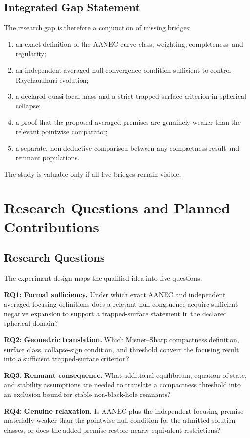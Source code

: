 \documentclass[conference]{IEEEtran}
\begin{document}
\subsection{Integrated Gap Statement}
The research gap is therefore a conjunction of missing bridges:
\begin{enumerate}
\item an exact definition of the AANEC curve class, weighting, completeness, and regularity;
\item an independent averaged null-convergence condition sufficient to control Raychaudhuri evolution;
\item a declared quasi-local mass and a strict trapped-surface criterion in spherical collapse;
\item a proof that the proposed averaged premises are genuinely weaker than the relevant pointwise comparator;
\item a separate, non-deductive comparison between any compactness result and remnant populations.
\end{enumerate}
The study is valuable only if all five bridges remain visible.

\section{Research Questions and Planned Contributions}
\label{sec:rqs}

\subsection{Research Questions}
The experiment design maps the qualified idea into five questions.

\textbf{RQ1: Formal sufficiency.} Under which exact AANEC and independent averaged focusing definitions does a relevant null congruence acquire sufficient negative expansion to support a trapped-surface statement in the declared spherical domain?

\textbf{RQ2: Geometric translation.} Which Misner--Sharp compactness definition, surface class, collapse-sign condition, and threshold convert the focusing result into a sufficient trapped-surface criterion?

\textbf{RQ3: Remnant consequence.} What additional equilibrium, equation-of-state, and stability assumptions are needed to translate a compactness threshold into an exclusion bound for stable non-black-hole remnants?

\textbf{RQ4: Genuine relaxation.} Is AANEC plus the independent focusing premise materially weaker than the pointwise null condition for the admitted solution classes, or does the added premise restore nearly equivalent restrictions?
\end{document}
